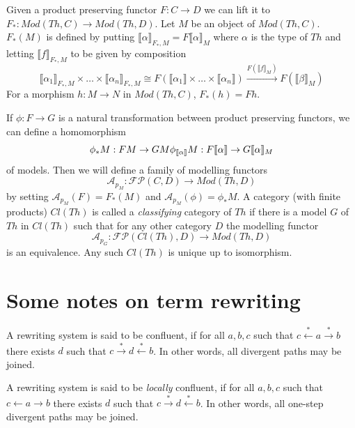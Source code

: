 \documentclass[acmsmall,screen, nonacm, anonymous]{acmart}
\begin{document}
Given a product preserving functor $F : C \to D$ we can lift it to $F_{*} : Mod(Th, C) \to Mod(Th,D)$.
Let $M$ be an object of $Mod(Th,C)$.
$F_{*}(M)$ is defined by putting $\llbracket \alpha \rrbracket_{F_{*}, M} = F\llbracket \alpha \rrbracket_{M}$ where $\alpha$ is the type of $Th$ and letting
$\llbracket f \rrbracket_{F_{*},M}$ to be given by composition
\[
  \llbracket \alpha_{1} \rrbracket_{F_{*}, M} \times \ldots \times \llbracket \alpha_{n} \rrbracket_{F_{*}, M} \cong F(\llbracket \alpha_{1} \rrbracket \times \ldots \times \llbracket \alpha_{n} \rrbracket) \xrightarrow{F(\llbracket f \rrbracket_{M})} F(\llbracket \beta \rrbracket_{M})
\]
For a morphism $h : M \to N$ in $Mod(Th,C)$, $F_{*}(h) = Fh$.

If $\phi : F \to G$ is a natural transformation between product preserving functors, we can define a homomorphism
\[
\phi_{*}M : FM \to GM\\
\phi_{\llbracket \alpha \rrbracket}M : F\llbracket \alpha \rrbracket \to G\llbracket \alpha \rrbracket_{M}
\]
of models.
Then we will define a family of modelling functors
\[
\mathcal{A}_{p_{M}} : \mathcal{FP}(C,D) \to Mod(Th,D)
\]
by setting $\mathcal{A}_{p_{M}}(F) = F_{*}(M)$ and $\mathcal{A}_{p_{M}}(\phi) = \phi_{*}M$.
A category (with finite products) $Cl(Th)$ is called a \emph{classifying} category of $Th$ if there is a model $G$ of $Th$ in $Cl(Th)$ such that for any other category $D$ the modelling functor
\[
\mathcal{A}_{p_{G}} : \mathcal{FP}(Cl(Th),D) \to Mod(Th,D)
\]
is an equivalence.
Any such $Cl(Th)$ is unique up to isomorphism.


\section{Some notes on term rewriting}

\begin{definition}[Confluence]
A rewriting system is said to be confluent, if for all $a,b,c$ such that  $ c \xleftarrow{*} a \xrightarrow{*} b$ there exists $d$ such that $c \xrightarrow{*} d \xleftarrow{*} b$.
In other words, all divergent paths may be joined.
\end{definition}

\begin{definition}
  A rewriting system is said to be \textit{locally} confluent, if for all $a,b,c$ such that  $ c \xleftarrow{} a \xrightarrow{} b$ there exists $d$ such that $c \xrightarrow{*} d \xleftarrow{*} b$.
In other words, all one-step divergent paths may be joined.
\end{definition}
\end{document}
